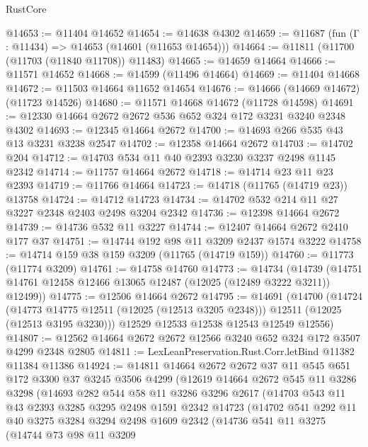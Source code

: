 \begin{lexlean}{RustCore}
\begin{coremodule}
@14653 := @11404 @14652
@14654 := @14638 @4302
@14659 := @11687 (fun (Γ : @11434) => @14653 (@14601 (@11653 @14654)))
@14664 := @11811 (@11700 (@11703 (@11840 @11708)) @11483)
@14665 := @14659 @14664
@14666 := @11571 @14652
@14668 := @14599 (@11496 @14664)
@14669 := @11404 @14668
@14672 := @11503 @14664 @11652 @14654
@14676 := @14666 (@14669 @14672) (@11723 @14526)
@14680 := @11571 @14668 @14672 (@11728 @14598)
@14691 := @12330 @14664 @2672 @2672 @536 @652 @324 @172 @3231 @3240 @2348 @4302
@14693 := @12345 @14664 @2672
@14700 := @14693 @266 @535 @43 @13 @3231 @3238 @2547
@14702 := @12358 @14664 @2672
@14703 := @14702 @204
@14712 := @14703 @534 @11 @40 @2393 @3230 @3237 @2498 @1145 @2342
@14714 := @11757 @14664 @2672
@14718 := @14714 @23 @11 @23 @2393
@14719 := @11766 @14664
@14723 := @14718 (@11765 (@14719 @23)) @13758
@14724 := @14712 @14723
@14734 := @14702 @532 @214 @11 @27 @3227 @2348 @2403 @2498 @3204 @2342
@14736 := @12398 @14664 @2672
@14739 := @14736 @532 @11 @3227
@14744 := @12407 @14664 @2672 @2410 @177 @37
@14751 := @14744 @192 @98 @11 @3209 @2437 @1574 @3222
@14758 := @14714 @159 @38 @159 @3209 (@11765 (@14719 @159))
@14760 := @11773 (@11774 @3209)
@14761 := @14758 @14760
@14773 := @14734
    (@14739 (@14751 @14761 @12458 @12466 @13065 @12487 (@12025 (@12489 @3222 @3211)) @12499))
@14775 := @12506 @14664 @2672
@14795 := @14691
    (@14700
      (@14724
        (@14773 @14775 @12511 (@12025 (@12513 @3205 @2348)))
        @12511
        (@12025 (@12513 @3195 @3230)))
      @12529
      @12533
      @12538
      @12543
      @12549
      @12556)
@14807 := @12562 @14664 @2672 @2672 @12566 @3240 @652 @324 @172 @3507 @4299 @2348 @2805
@14811 := LexLeanPreservation.Rust.Corr.letBind @11382 @11384 @11386
@14924 := @14811
    @14664
    @2672
    @2672
    @37
    @11
    @545
    @651
    @172
    @3300
    @37
    @3245
    @3506
    @4299
    (@12619
      @14664
      @2672
      @545
      @11
      @3286
      @3298
      (@14693
        @282
        @544
        @58
        @11
        @3286
        @3296
        @2617
        (@14703
          @543
          @11
          @43
          @2393
          @3285
          @3295
          @2498
          @1591
          @2342
          @14723
          (@14702
            @541
            @292
            @11
            @40
            @3275
            @3284
            @3294
            @2498
            @1609
            @2342
            (@14736
              @541
              @11
              @3275
              (@14744
                @73
                @98
                @11
                @3209

\end{coremodule}
\end{lexlean}
